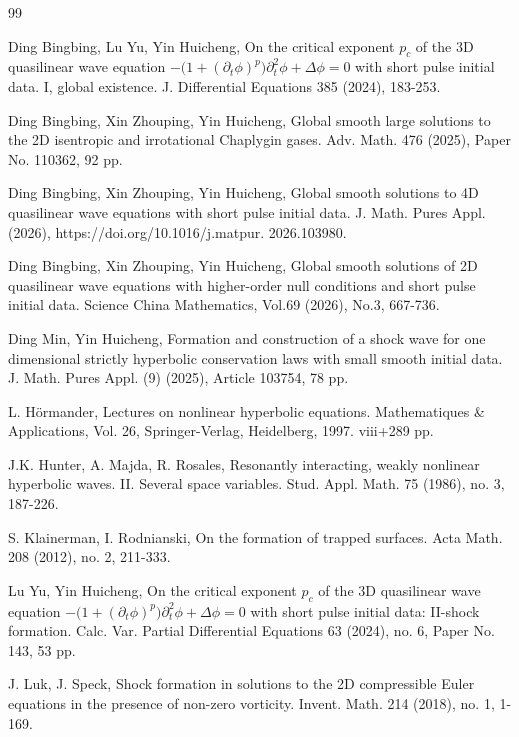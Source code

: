 \documentclass[11pt,twoside]{article}
\begin{document}
\begin{thebibliography}{99}
	
  Ding Bingbing, Lu Yu, Yin Huicheng, On the critical exponent $p_c$ of the 3D quasilinear wave
equation $-\big(1+(\partial_t\phi)^p\big)\partial_t^2\phi+\Delta\phi=0$ with short pulse initial data. I, global existence.
J. Differential Equations 385 (2024), 183-253.
	
	
		
 Ding Bingbing, Xin Zhouping, Yin Huicheng, Global smooth large solutions to the 2D isentropic and irrotational
Chaplygin gases. Adv. Math. 476 (2025), Paper No. 110362, 92 pp.
	
	
  Ding Bingbing, Xin Zhouping, Yin Huicheng, Global smooth solutions to 4D quasilinear wave equations
with short pulse initial data. J. Math. Pures Appl. (2026), https://doi.org/10.1016/j.matpur. 2026.103980.
	
 Ding Bingbing, Xin Zhouping, Yin Huicheng, Global smooth solutions of 2D quasilinear wave equations with
higher-order null conditions and short pulse initial data. Science China Mathematics,
Vol.69 (2026),  No.3, 667-736.

 Ding Min, Yin Huicheng, Formation and construction of a shock wave for one dimensional
strictly hyperbolic conservation laws with small smooth initial data. J. Math. Pures Appl. (9) (2025),
Article 103754, 78 pp.
	
 L. H\"ormander, Lectures on nonlinear hyperbolic equations. Mathematiques \& Applications, Vol. 26, Springer-Verlag,
Heidelberg, 1997. viii+289 pp.
	
 J.K. Hunter, A. Majda, R. Rosales, Resonantly interacting, weakly nonlinear hyperbolic waves. II.
Several space variables. Stud. Appl. Math. 75  (1986), no. 3, 187-226.



 S. Klainerman, I. Rodnianski, On the formation of trapped surfaces.
Acta Math. 208 (2012), no. 2, 211-333.


 Lu Yu, Yin Huicheng, On the critical exponent $p_c$ of the 3D quasilinear wave equation
$-\big(1+(\partial_t\phi)^p\big)\partial_t^2\phi+\Delta\phi=0$ with short pulse initial data: II-shock formation.
Calc. Var. Partial Differential Equations 63 (2024), no. 6, Paper No. 143, 53 pp.

 J. Luk, J. Speck, Shock formation in solutions to the 2D compressible Euler equations in the presence
of non-zero vorticity. Invent. Math. 214 (2018), no. 1, 1-169.


\end{thebibliography}
\end{document}
